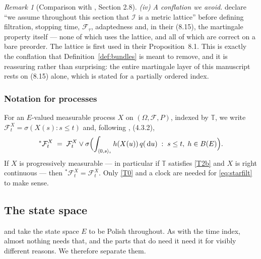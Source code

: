 \documentclass[11pt,a4paper]{article}
\theoremstyle{plain}
\theoremstyle{definition}
\theoremstyle{remark}
\newtheorem{remark}[theorem]{Remark}
\newcommand{\T}{\mathbb{T}}                     %
\newcommand{\Bdd}{B}                           %
\newcommand{\Filt}{\mathcal{F}}
\newcommand{\dif}{\,\mathrm{d}}
\newcommand{\EK}{\cite{EK86}}
\newcommand{\CPS}{\cite{CPS23}}
\begin{document}
\begin{remark}[Comparison with \EK, Section 2.8]
  \emph{(iv) A conflation we avoid.}  \EK{} declare ``we assume throughout this
  section that $\mathscr{I}$ is a metric lattice'' before defining filtration,
  stopping time, $\Filt_\tau$, adaptedness and, in their (8.15), the martingale
  property itself --- none of which uses the lattice, and all of which are
  correct on a bare preorder.  The lattice is first used in their
  Proposition~8.1.  This is exactly the conflation that
  Definition~\ref{def:bundles} is meant to remove, and it is reassuring rather
  than surprising: the entire martingale layer of this manuscript rests on
  \EK{} (8.15) alone, which is stated for a partially ordered index.
\end{remark}

\subsubsection*{Notation for processes}

For an $E$-valued measurable process $X$ on $(\Omega,\Filt,P)$, indexed by $\T$,
we write $\Filt^X_t = \sigma(X(s) : s \leq t)$ and, following \EK, (4.3.2),
\begin{equation}
  \label{eq:starfilt}
  {}^{*}\Filt^X_t
  \;=\; \Filt^X_t \vee
        \sigma\Bigl( \int_{\langle 0,s \rangle_\iota} h(X(u)) \, q(\dif u)
          \;:\; s \leq t,\; h \in \Bdd(E) \Bigr).
\end{equation}
If $X$ is progressively measurable --- in particular if $\T$ satisfies \eqref{T2b} and
$X$ is right continuous --- then ${}^{*}\Filt^X_t = \Filt^X_t$.  Only \eqref{T0} and a
clock are needed for \eqref{eq:starfilt} to make sense.

\subsection{The state space}
\label{ssec:statespace}

\EK{} and \CPS{} take the state space $E$ to be Polish throughout.  As with the
time index, almost nothing needs that, and the parts that do need it need it for
visibly different reasons.  We therefore separate them.
\end{document}
